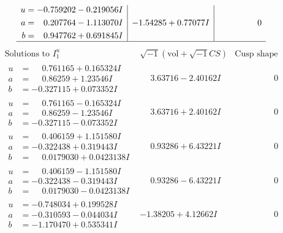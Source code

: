 \documentclass[1p]{elsarticle_modified}
\theoremstyle{definition}
\newcommand{\I}{\sqrt{-1}}
\begin{document}
$$\begin{array}{c|c|c}
\begin{aligned}
u &= -0.759202 - 0.219056 I \\
a &= \phantom{-}0.207764 - 1.113070 I \\
b &= \phantom{-}0.947762 + 0.691845 I\end{aligned}
 & -1.54285 + 0.77077 I & \phantom{-0.000000 } 0\\
 \hline 
 \end{array}$$\newpage$$\begin{array}{c|c|c}  
\text{Solutions to }I^u_{1}& \I (\text{vol} + \sqrt{-1}CS) & \text{Cusp shape}\\
 \hline 
\begin{aligned}
u &= \phantom{-}0.761165 + 0.165324 I \\
a &= \phantom{-}0.86259 + 1.23546 I \\
b &= -0.327115 + 0.073352 I\end{aligned}
 & \phantom{-}3.63716 - 2.40162 I & \phantom{-0.000000 } 0 \\ \hline\begin{aligned}
u &= \phantom{-}0.761165 - 0.165324 I \\
a &= \phantom{-}0.86259 - 1.23546 I \\
b &= -0.327115 - 0.073352 I\end{aligned}
 & \phantom{-}3.63716 + 2.40162 I & \phantom{-0.000000 } 0 \\ \hline\begin{aligned}
u &= \phantom{-}0.406159 + 1.151580 I \\
a &= -0.322438 + 0.319443 I \\
b &= \phantom{-}0.0179030 + 0.0423138 I\end{aligned}
 & \phantom{-}0.93286 + 6.43221 I & \phantom{-0.000000 } 0 \\ \hline\begin{aligned}
u &= \phantom{-}0.406159 - 1.151580 I \\
a &= -0.322438 - 0.319443 I \\
b &= \phantom{-}0.0179030 - 0.0423138 I\end{aligned}
 & \phantom{-}0.93286 - 6.43221 I & \phantom{-0.000000 } 0 \\ \hline\begin{aligned}
u &= -0.748034 + 0.199528 I \\
a &= -0.310593 - 0.044034 I \\
b &= -1.170470 + 0.535341 I\end{aligned}
 & -1.38205 + 4.12662 I & \phantom{-0.000000 } 0 \\ \hline\begin{aligned}

\end{aligned}
\end{array}$$
\end{document}
